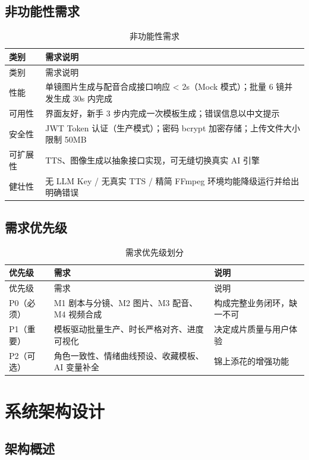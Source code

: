 \documentclass[12pt]{ctexrep}
\begin{document}
\section{非功能性需求}

\begin{longtable}{p{2.4cm}p{12.6cm}}
\caption{非功能性需求}\label{tab:nonfunc}\\
\toprule
类别 & 需求说明\\
\midrule
\endfirsthead
\toprule
类别 & 需求说明\\
\midrule
\endhead
性能 & 单镜图片生成与配音合成接口响应 < 2s（Mock 模式）；批量 6 镜并发生成 30s 内完成\\
可用性 & 界面友好，新手 3 步内完成一次模板生成；错误信息以中文提示\\
安全性 & JWT Token 认证（生产模式）；密码 bcrypt 加密存储；上传文件大小限制 50MB\\
可扩展性 & TTS、图像生成以抽象接口实现，可无缝切换真实 AI 引擎\\
健壮性 & 无 LLM Key / 无真实 TTS / 精简 FFmpeg 环境均能降级运行并给出明确错误\\
\bottomrule
\end{longtable}

\section{需求优先级}

\begin{longtable}{p{2.4cm}p{6cm}p{6.6cm}}
\caption{需求优先级划分}\label{tab:priority}\\
\toprule
优先级 & 需求 & 说明\\
\midrule
\endfirsthead
\toprule
优先级 & 需求 & 说明\\
\midrule
\endhead
P0（必须） & M1 剧本与分镜、M2 图片、M3 配音、M4 视频合成 & 构成完整业务闭环，缺一不可\\
P1（重要） & 模板驱动批量生产、时长严格对齐、进度可视化 & 决定成片质量与用户体验\\
P2（可选） & 角色一致性、情绪曲线预设、收藏模板、AI 变量补全 & 锦上添花的增强功能\\
\bottomrule
\end{longtable}

\chapter{系统架构设计}
\section{架构概述}
\end{document}
